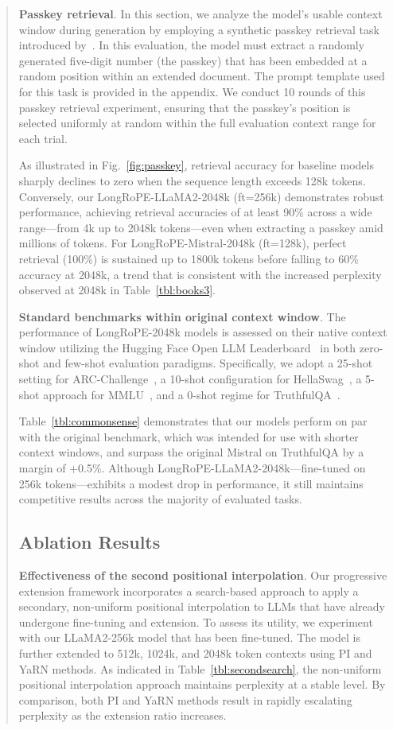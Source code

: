 \begin{abstract}
\textbf{Passkey retrieval}. In this section, we analyze the model's usable context window during generation by employing a synthetic passkey retrieval task introduced by~\cite{passkey}. In this evaluation, the model must extract a randomly generated five-digit number (the passkey) that has been embedded at a random position within an extended document. The prompt template used for this task is provided in the appendix. We conduct 10 rounds of this passkey retrieval experiment, ensuring that the passkey’s position is selected uniformly at random within the full evaluation context range for each trial.

As illustrated in Fig.~\ref{fig:passkey}, retrieval accuracy for baseline models sharply declines to zero when the sequence length exceeds 128k tokens. Conversely, our LongRoPE-LLaMA2-2048k (ft=256k) demonstrates robust performance, achieving retrieval accuracies of at least 90\% across a wide range—from 4k up to 2048k tokens—even when extracting a passkey amid millions of tokens. For LongRoPE-Mistral-2048k (ft=128k), perfect retrieval (100\%) is sustained up to 1800k tokens before falling to 60\% accuracy at 2048k, a trend that is consistent with the increased perplexity observed at 2048k in Table~\ref{tbl:books3}.

\textbf{Standard benchmarks within original context window}. The performance of LongRoPE-2048k models is assessed on their native context window utilizing the Hugging Face Open LLM Leaderboard~\cite{huggingfaceboard} in both zero-shot and few-shot evaluation paradigms. Specifically, we adopt a 25-shot setting for ARC-Challenge~\cite{allenai:arc}, a 10-shot configuration for HellaSwag~\cite{zellers2019hellaswag}, a 5-shot approach for MMLU~\cite{mmlu}, and a 0-shot regime for TruthfulQA~\cite{lin2021truthfulqa}.

Table~\ref{tbl:commonsense} demonstrates that our models perform on par with the original benchmark, which was intended for use with shorter context windows, and surpass the original Mistral on TruthfulQA by a margin of +0.5\%. Although LongRoPE-LLaMA2-2048k—fine-tuned on 256k tokens—exhibits a modest drop in performance, it still maintains competitive results across the majority of evaluated tasks.

\subsection{Ablation Results}

\textbf{Effectiveness of the second positional interpolation}. Our progressive extension framework incorporates a search-based approach to apply a secondary, non-uniform positional interpolation to LLMs that have already undergone fine-tuning and extension. To assess its utility, we experiment with our LLaMA2-256k model that has been fine-tuned. The model is further extended to 512k, 1024k, and 2048k token contexts using PI and YaRN methods. As indicated in Table~\ref{tbl:secondsearch}, the non-uniform positional interpolation approach maintains perplexity at a stable level. By comparison, both PI and YaRN methods result in rapidly escalating perplexity as the extension ratio increases.


\end{abstract}
